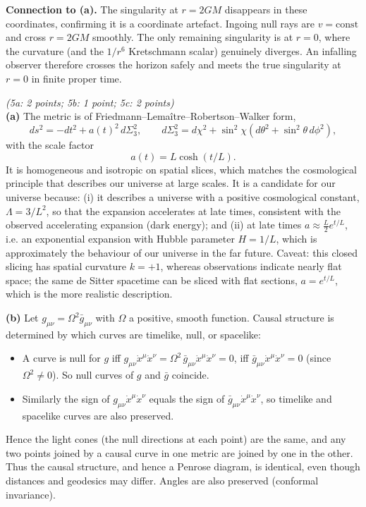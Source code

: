 \documentclass[12pt]{article}
\newcommand{\be}{\begin{equation}}
\newcommand{\ee}{\end{equation}}
\newcounter{ansno}
\newcommand{\ans}[1]{\vspace{2em}\stepcounter{ansno}
\noindent{\bf Question \theansno.} \emph{(#1)}\\[0.5em]
}
\begin{document}
\textbf{Connection to (a).} The singularity at $r=2GM$ disappears in these coordinates, confirming it is a coordinate artefact. Ingoing null rays are $v=\text{const}$ and cross $r=2GM$ smoothly. The only remaining singularity is at $r=0$, where the curvature (and the $1/r^6$ Kretschmann scalar) genuinely diverges. An infalling observer therefore crosses the horizon safely and meets the true singularity at $r=0$ in finite proper time.

\ans{5a: 2 points; 5b: 1 point; 5c: 2 points}
\textbf{(a)} The metric is of Friedmann--Lema\^itre--Robertson--Walker form,
\be
ds^2 = -dt^2 + a(t)^2\,d\Sigma_3^2,\qquad d\Sigma_3^2 = d\chi^2 + \sin^2\chi\left(d\theta^2+\sin^2\theta\,d\phi^2\right),
\ee
with the scale factor
\be
a(t) = L\cosh(t/L).
\ee
It is homogeneous and isotropic on spatial slices, which matches the cosmological principle that describes our universe at large scales. It is a candidate for our universe because: (i) it describes a universe with a positive cosmological constant, $\Lambda = 3/L^2$, so that the expansion accelerates at late times, consistent with the observed accelerating expansion (dark energy); and (ii) at late times $a \approx \tfrac{L}{2}e^{t/L}$, i.e. an exponential expansion with Hubble parameter $H = 1/L$, which is approximately the behaviour of our universe in the far future. Caveat: this closed slicing has spatial curvature $k=+1$, whereas observations indicate nearly flat space; the same de Sitter spacetime can be sliced with flat sections, $a=e^{t/L}$, which is the more realistic description.

\textbf{(b)} Let $g_{\mu\nu} = \Omega^2\bar g_{\mu\nu}$ with $\Omega$ a positive, smooth function. Causal structure is determined by which curves are timelike, null, or spacelike:
\begin{itemize}
\item A curve is null for $g$ iff $g_{\mu\nu}\dot x^\mu\dot x^\nu = \Omega^2\,\bar g_{\mu\nu}\dot x^\mu\dot x^\nu = 0$, iff $\bar g_{\mu\nu}\dot x^\mu\dot x^\nu=0$ (since $\Omega^2\neq 0$). So null curves of $g$ and $\bar g$ coincide.
\item Similarly the sign of $g_{\mu\nu}\dot x^\mu\dot x^\nu$ equals the sign of $\bar g_{\mu\nu}\dot x^\mu\dot x^\nu$, so timelike and spacelike curves are also preserved.
\end{itemize}
Hence the light cones (the null directions at each point) are the same, and any two points joined by a causal curve in one metric are joined by one in the other. Thus the causal structure, and hence a Penrose diagram, is identical, even though distances and geodesics may differ. Angles are also preserved (conformal invariance).
\end{document}
